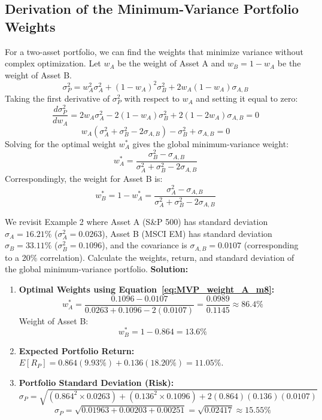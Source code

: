 \subsection{Derivation of the Minimum-Variance Portfolio Weights}
\label{subsec:Derivation of MVP}
For a two-asset portfolio, we can find the weights that minimize variance without complex optimization. Let $w_A$ be the weight of Asset A and $w_B = 1 - w_A$ be the weight of Asset B.
\[
\sigma_P^2 = w_A^2 \sigma_A^2 + (1 - w_A)^2 \sigma_B^2 + 2 w_A (1 - w_A) \sigma_{A,B}
\]
Taking the first derivative of $\sigma_P^2$ with respect to $w_A$ and setting it equal to zero:
\[
\frac{d\sigma_P^2}{dw_A} = 2 w_A \sigma_A^2 - 2(1 - w_A) \sigma_B^2 + 2(1 - 2w_A) \sigma_{A,B} = 0
\]
\[
w_A (\sigma_A^2 + \sigma_B^2 - 2\sigma_{A,B}) - \sigma_B^2 + \sigma_{A,B} = 0
\]
Solving for the optimal weight $w_A^*$ gives the global minimum-variance weight:
\begin{equation}
	w_A^* = \frac{\sigma_B^2 - \sigma_{A,B}}{\sigma_A^2 + \sigma_B^2 - 2\sigma_{A,B}}
	\label{eq:MVP_weight_A_m8}
\end{equation}
Correspondingly, the weight for Asset B is:
\begin{equation}
	w_B^* = 1 - w_A^* = \frac{\sigma_A^2 - \sigma_{A,B}}{\sigma_A^2 + \sigma_B^2 - 2\sigma_{A,B}}
	\label{eq:MVP_weight_B_m8}
\end{equation}
\begin{tcolorbox}[
	colback=gray!5!white,
	colframe=black!15!white,
	boxrule=0.5pt,
	arc=3pt,
	title=\textbf{Example 10: Calculating Minimum-Variance Weights},
	coltitle=black,
	colbacktitle=black!5!white,
	before skip=6pt,
	after skip=6pt,
	breakable
]
We revisit Example 2 where Asset A (S\&P 500) has standard deviation $\sigma_A = 16.21\%$ ($\sigma_A^2 = 0.0263$), Asset B (MSCI EM) has standard deviation $\sigma_B = 33.11\%$ ($\sigma_B^2 = 0.1096$), and the covariance is $\sigma_{A,B} = 0.0107$ (corresponding to a 20\% correlation).
Calculate the weights, return, and standard deviation of the global minimum-variance portfolio.
\textbf{Solution:}
\begin{enumerate}
	\item \textbf{Optimal Weights using Equation~\ref{eq:MVP_weight_A_m8}:}
	      \[
	      w_A^* = \frac{0.1096 - 0.0107}{0.0263 + 0.1096 - 2(0.0107)} = \frac{0.0989}{0.1145} \approx 86.4\%
	      \]
	      Weight of Asset B:
	      \[
	      w_B^* = 1 - 0.864 = 13.6\%
	      \]
	\item \textbf{Expected Portfolio Return:} $E[R_P] = 0.864(9.93\%) + 0.136(18.20\%) = 11.05\%$.
	\item \textbf{Portfolio Standard Deviation (Risk):}
	      \[
	      \sigma_P = \sqrt{(0.864^2 \times 0.0263) + (0.136^2 \times 0.1096) + 2(0.864)(0.136)(0.0107)}
	      \]
	      \[
	      \sigma_P = \sqrt{0.01963 + 0.00203 + 0.00251} = \sqrt{0.02417} \approx 15.55\%
	      \]
\end{enumerate}
\end{tcolorbox}
